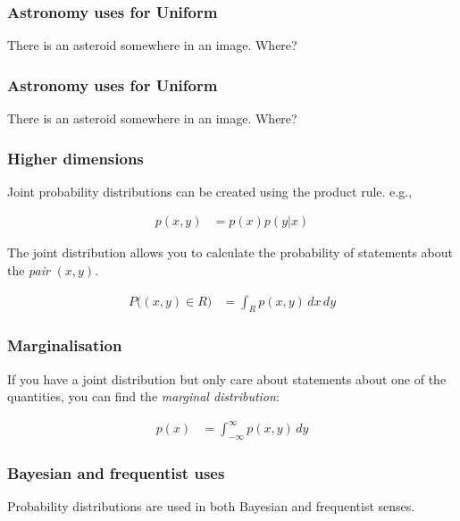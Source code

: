 \documentclass{beamer}
\begin{document}
\begin{frame}[t, fragile]
\frametitle{Astronomy uses for Uniform}

There is an asteroid somewhere in an image. Where?

\end{frame}


\begin{frame}[t, fragile]
\frametitle{Astronomy uses for Uniform}

There is an asteroid somewhere in an image. Where?

\end{frame}




\begin{frame}[t, fragile]
\frametitle{Higher dimensions}

Joint probability distributions can be created using the product rule.
e.g.,

\begin{align}
p(x, y) &= p(x) p(y | x)
\end{align}

The joint distribution allows you to calculate the probability of statements
about the {\em pair} $(x, y)$.

\begin{align}
P\big((x, y) \in R\big) &= \int_R p(x, y) \, dx \, dy
\end{align}



\end{frame}


\begin{frame}[t, fragile]
\frametitle{Marginalisation}

If you have a joint distribution but only care about statements about one of
the quantities, you can find the {\em marginal distribution}:\vspace{2em}

\begin{align}
p(x) &= \int_{-\infty}^{\infty} p(x, y) \, dy
\end{align}



\end{frame}


\begin{frame}[t, fragile]
\frametitle{Bayesian and frequentist uses}

Probability distributions are used in both Bayesian and frequentist senses.

\end{frame}
\end{document}
